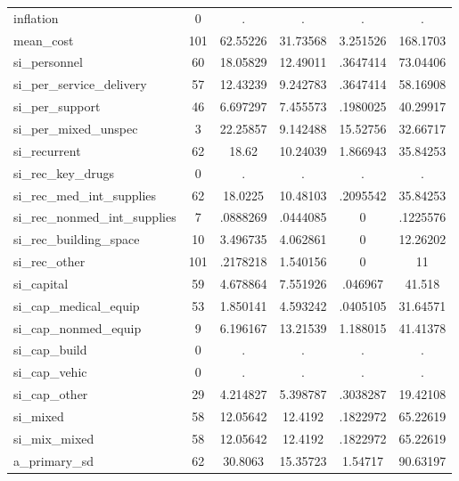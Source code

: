 \begin{table}[htbp]
\begin{tabular}{l*{1}{ccccc}}
inflation   &           0&           .&           .&           .&           .\\
mean\_cost   &         101&    62.55226&    31.73568&    3.251526&    168.1703\\
si\_personnel&          60&    18.05829&    12.49011&    .3647414&    73.04406\\
si\_per\_service\_delivery&          57&    12.43239&    9.242783&    .3647414&    58.16908\\
si\_per\_support&          46&    6.697297&    7.455573&    .1980025&    40.29917\\
si\_per\_mixed\_unspec&           3&    22.25857&    9.142488&    15.52756&    32.66717\\
si\_recurrent&          62&       18.62&    10.24039&    1.866943&    35.84253\\
si\_rec\_key\_drugs&           0&           .&           .&           .&           .\\
si\_rec\_med\_int\_supplies&          62&     18.0225&    10.48103&    .2095542&    35.84253\\
si\_rec\_nonmed\_int\_supplies&           7&    .0888269&    .0444085&           0&    .1225576\\
si\_rec\_building\_space&          10&    3.496735&    4.062861&           0&    12.26202\\
si\_rec\_other&         101&    .2178218&    1.540156&           0&          11\\
si\_capital  &          59&    4.678864&    7.551926&     .046967&      41.518\\
si\_cap\_medical\_equip&          53&    1.850141&    4.593242&    .0405105&    31.64571\\
si\_cap\_nonmed\_equip&           9&    6.196167&    13.21539&    1.188015&    41.41378\\
si\_cap\_build&           0&           .&           .&           .&           .\\
si\_cap\_vehic&           0&           .&           .&           .&           .\\
si\_cap\_other&          29&    4.214827&    5.398787&    .3038287&    19.42108\\
si\_mixed    &          58&    12.05642&     12.4192&    .1822972&    65.22619\\
si\_mix\_mixed&          58&    12.05642&     12.4192&    .1822972&    65.22619\\
a\_primary\_sd&          62&     30.8063&    15.35723&     1.54717&    90.63197\\

\end{tabular}
\end{table}

